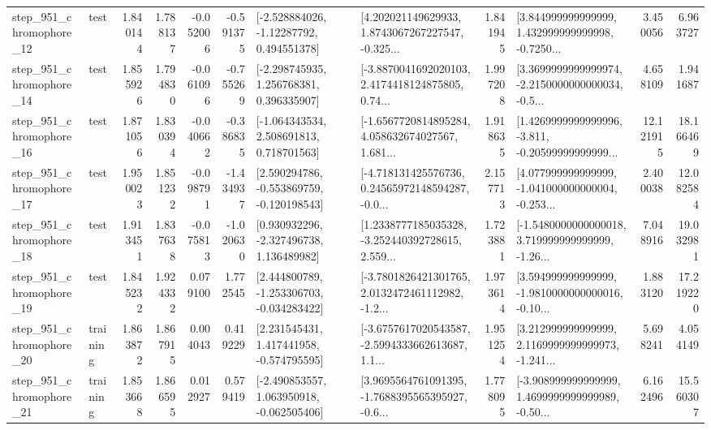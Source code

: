 \begin{tabular}{llrrrrllrlrr}
  step\_951\_chromophore\_12 &      test &      1.840144 &    1.788137 &     -0.052006 & -0.591375 &    [-2.528884026, -1.12287792, 0.494551378] &  [4.202021149629933, 1.8743067267227547, -0.325... &       1.841945 &  [3.844999999999999, 1.432999999999998, -0.7250... &            3.450056 &          6.963727 \\
  step\_951\_chromophore\_14 &      test &      1.855926 &    1.794830 &     -0.061096 & -0.755269 &    [-2.298745935, 1.256768381, 0.396335907] &  [-3.8870041692020103, 2.4174418124875805, 0.74... &       1.997208 &  [3.3699999999999974, -2.2150000000000034, -0.5... &            4.658109 &          1.941687 \\
  step\_951\_chromophore\_16 &      test &      1.871056 &    1.830394 &     -0.040662 & -0.386835 &    [-1.064343534, 2.508691813, 0.718701563] &  [-1.6567720814895284, 4.058632674027567, 1.681... &       1.918635 &  [1.4269999999999996, -3.811, -0.20599999999999... &           12.121915 &         18.166469 \\
  step\_951\_chromophore\_17 &      test &      1.950023 &    1.851232 &     -0.098791 & -1.434937 &   [2.590294786, -0.553869759, -0.120198543] &  [-4.718131425576736, 0.24565972148594287, -0.0... &       2.157713 &  [4.077999999999999, -1.041000000000004, -0.253... &            2.400038 &         12.082584 \\
  step\_951\_chromophore\_18 &      test &      1.913451 &    1.837638 &     -0.075813 & -1.020630 &    [0.930932296, -2.327496738, 1.136489982] &  [1.2338777185035328, -3.252440392728615, 2.559... &       1.723881 &  [-1.5480000000000018, 3.719999999999999, -1.26... &            7.048916 &         19.032981 \\
  step\_951\_chromophore\_19 &      test &      1.845232 &    1.924332 &      0.079100 &  1.772545 &   [2.444800789, -1.253306703, -0.034283422] &  [-3.7801826421301765, 2.0132472461112982, -1.2... &       1.973614 &  [3.594999999999999, -1.9810000000000016, -0.10... &            1.883120 &         17.219220 \\
  step\_951\_chromophore\_20 &  training &      1.863872 &    1.867915 &      0.004043 &  0.419229 &    [2.231545431, 1.417441958, -0.574795595] &  [-3.6757617020543587, -2.5994333662613687, 1.1... &       1.951254 &  [3.212999999999999, 2.1169999999999973, -1.241... &            5.698241 &          4.054149 \\
  step\_951\_chromophore\_21 &  training &      1.853668 &    1.866595 &      0.012927 &  0.579419 &   [-2.490853557, 1.063950918, -0.062505406] &  [3.9695564761091395, -1.7688395565395927, -0.6... &       1.778095 &  [-3.908999999999999, 1.4699999999999989, -0.50... &            6.162496 &         15.560307 \\

\end{tabular}
